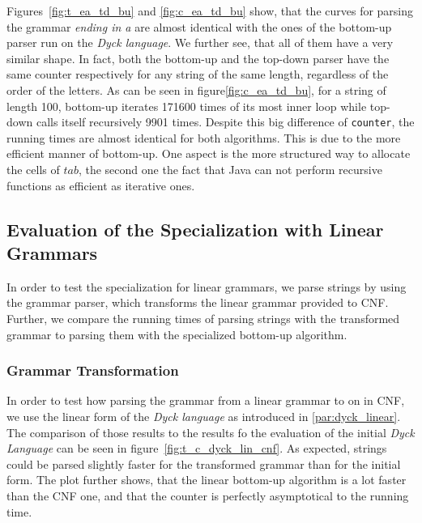 Figures~\ref{fig:t_ea_td_bu} and \ref{fig:c_ea_td_bu} show, that the curves for parsing the grammar \textit{ending in a} are almost identical with the ones of the bottom-up parser run on the \textit{Dyck language}.
We further see, that all of them have a very similar shape.
In fact, both the bottom-up and the top-down parser have the same counter respectively for any string of the same length, regardless of the order of the letters.
As can be seen in figure\ref{fig:c_ea_td_bu}, for a string of length 100, bottom-up iterates 171600 times of its most inner loop while top-down calls itself recursively 9901 times.
Despite this big difference of \texttt{counter}, the running times are almost identical for both algorithms.
This is due to the more efficient manner of bottom-up.
One aspect is the more structured way to allocate the cells of $tab$, the second one the fact that Java can not perform recursive functions as efficient as iterative ones. 


\subsection{Evaluation of the Specialization with Linear Grammars}
In order to test the specialization for linear grammars, we parse strings by using the grammar parser, which transforms the linear grammar provided to CNF.
Further, we compare the running times of parsing strings with the transformed grammar to parsing them with the specialized bottom-up algorithm.

\subsubsection{Grammar Transformation}
In order to test how parsing the grammar from a linear grammar to on in CNF, we use the linear form of the \textit{Dyck language} as introduced in \ref{par:dyck_linear}.
The comparison of those results to the results fo the evaluation of the initial \textit{Dyck Language} can be seen in figure~\ref{fig:t_c_dyck_lin_cnf}.
As expected, strings could be parsed slightly faster for the transformed grammar than for the initial form.
The plot further shows, that the linear bottom-up algorithm is a lot faster than the CNF one, and that the counter is perfectly asymptotical to the running time.

